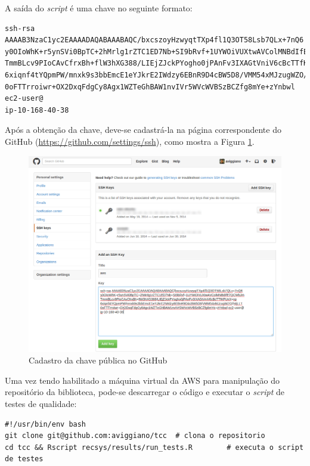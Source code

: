 A saída do \textit{script} é uma chave no seguinte formato:

\begin{lstlisting}[caption=Chave pública]
ssh-rsa AAAAB3NzaC1yc2EAAAADAQABAAABAQC/bxcszoyHzwyqtTXp4fl1Q3OT58Lsb7QLx+7nQ6
y0OIoWhK+r5ynSVi0BpTC+2hMrlg1rZTC1ED7Nb+SI9bRvf+1UYWOiVUXtwAVColMNBdIfE7QCWbJm
TmmBLcv9PIoCAvCfrxBh+flW3hXG388/LIEjZJckPYogho0jPAnFv3IXAGtVniV6cBcTTfKPUnX+np
6xiqnf4tYQpmPW/mnxk9s3bbEmcE1eYJkrE2IWdzy6EBnR9D4cBW5D8/VMM54xMJzugWZO//sIjLLT
0oFTTrroiwr+OX2DxqFdgCy8Agx1WZTeGhBAW1nvIVr5WVcWVBSzBCZfg8mYe+zYnbwl ec2-user@
ip-10-168-40-38
\end{lstlisting}

Após a obtenção da chave, deve-se cadastrá-la na página correspondente do GitHub (\url{https://github.com/settings/ssh}), como mostra a Figura \ref{fig:github_key}.

\begin{figure}[htp]
    \begin{center}
    \includegraphics[width=1\textwidth]{img/github_key}
    \end{center}
    \caption{Cadastro da chave pública no GitHub}
    \label{fig:github_key}
\end{figure}

Uma vez tendo habilitado a máquina virtual da AWS para manipulação do repositório da biblioteca, pode-se descarregar o código e executar o \textit{script} de testes de qualidade:

\begin{lstlisting}[caption=Script de execução dos testes de qualidade]
#!/usr/bin/env bash
git clone git@github.com:aviggiano/tcc	# clona o repositorio
cd tcc && Rscript recsys/results/run_tests.R 		# executa o script de testes
\end{lstlisting}